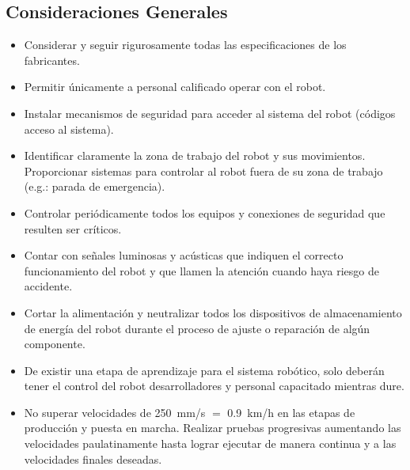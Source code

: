 \documentclass[withindex,glossary]{cam-thesis}
\begin{document}
\subsection{Consideraciones Generales}
\begin{itemize}
  \item Considerar y seguir rigurosamente todas las especificaciones de los fabricantes.
  \item Permitir únicamente a personal calificado operar con el robot.
  \item Instalar mecanismos de seguridad para acceder al sistema del robot (códigos acceso al sistema).
  \item Identificar claramente la zona de trabajo del robot y sus movimientos. Proporcionar sistemas para controlar al robot fuera de su zona de trabajo (e.g.: parada de emergencia).
  
  
  
  \item Controlar periódicamente todos los equipos y conexiones de seguridad que resulten ser críticos.
  \item Contar con señales luminosas y acústicas que indiquen el correcto funcionamiento del robot y que llamen la atención cuando haya riesgo de accidente.
  \item Cortar la alimentación y neutralizar todos los dispositivos de almacenamiento de energía del robot durante el proceso de ajuste o reparación de algún componente.
  \item De existir una etapa de aprendizaje para el sistema robótico, solo deberán tener el control del robot desarrolladores y personal capacitado mientras dure.
  \item No superar velocidades de \SI{250}{\milli\metre/\second} $=$ \SI{0.9}{\kilo\metre/\hour} en las etapas de producción y puesta en marcha. Realizar pruebas progresivas aumentando las velocidades paulatinamente hasta lograr ejecutar de manera continua y a las velocidades finales deseadas.
\end{itemize}
\end{document}
